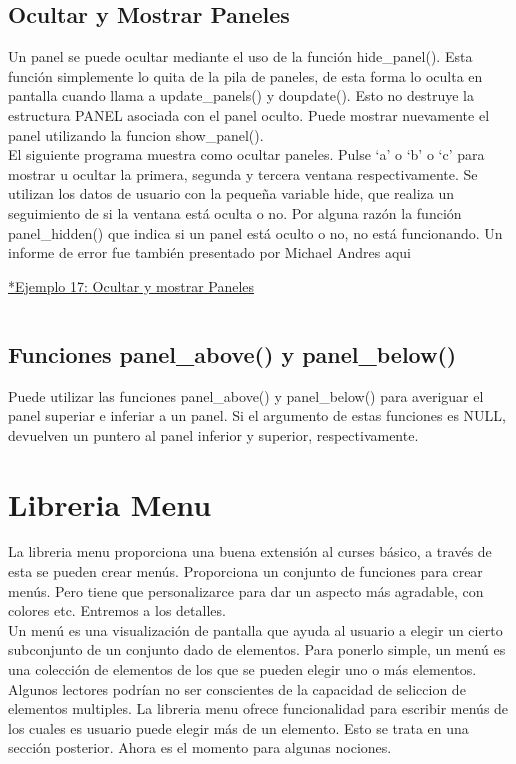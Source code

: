 \documentclass{article}
\begin{document}
\subsection{Ocultar y Mostrar Paneles}%
Un panel se puede ocultar mediante el uso de la función hide\_panel(). Esta
función simplemente lo quita de la pila de paneles, de esta forma lo oculta en
pantalla cuando llama a update\_panels() y doupdate(). Esto no destruye la
estructura PANEL asociada con el panel oculto. Puede mostrar nuevamente el
panel utilizando la funcion show\_panel().\\

El siguiente programa muestra como ocultar paneles. Pulse ‘a’ o ‘b’ o ‘c’ para
mostrar u ocultar la primera, segunda y tercera ventana respectivamente. Se
utilizan los datos de usuario con la pequeña variable hide, que realiza un
seguimiento de si la ventana está oculta o no. Por alguna razón la función
panel\_hidden() que indica si un panel está oculto o no, no está funcionando. Un
informe de error fue también presentado por Michael Andres aqui

\href{https://github.com/nasciiboy/NCURSES-Programming-HOWTO/blob/master/ncurses_programs/panels/panel_hide.c}{*Ejemplo 17: Ocultar y mostrar Paneles}
\inputminted{cpp}{./cpp/017_ocultar_mostrar_paneles.cpp}

\subsection{Funciones panel\_above() y panel\_below()}%
Puede utilizar las funciones panel\_above() y panel\_below() para averiguar el
panel superiar e inferiar a un panel. Si el argumento de estas funciones es
NULL, devuelven un puntero al panel inferior y superior, respectivamente.

\section{Libreria Menu}%
La libreria menu proporciona una buena extensión al curses básico, a través de
esta se pueden crear menús. Proporciona un conjunto de funciones para crear
menús. Pero tiene que personalizarce para dar un aspecto más agradable, con
colores etc. Entremos a los detalles.\\

Un menú es una visualización de pantalla que ayuda al usuario a elegir un
cierto subconjunto de un conjunto dado de elementos. Para ponerlo simple, un
menú es una colección de elementos de los que se pueden elegir uno o más
elementos. Algunos lectores podrían no ser conscientes de la capacidad de
seliccion de elementos multiples. La libreria menu ofrece funcionalidad para
escribir menús de los cuales es usuario puede elegir más de un elemento. Esto
se trata en una sección posterior. Ahora es el momento para algunas nociones.
\end{document}

